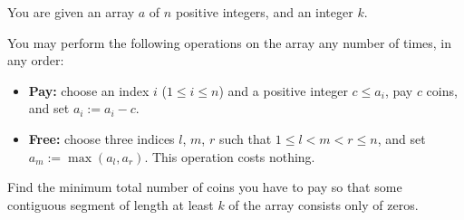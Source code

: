 You are given an array $a$ of $n$ positive integers, and an integer $k$.

You may perform the following operations on the array any number of times, in any order:

\begin{itemize}
  \item \textbf{Pay:} choose an index $i$ ($1 \le i \le n$) and a positive integer $c \le a_i$, pay $c$ coins, and set $a_i := a_i - c$.
  \item \textbf{Free:} choose three indices $l$, $m$, $r$ such that $1 \le l < m < r \le n$, and set $a_m := \max(a_l, a_r)$. This operation costs nothing.
\end{itemize}

Find the minimum total number of coins you have to pay so that some contiguous segment of length at least $k$ of the array consists only of zeros.
